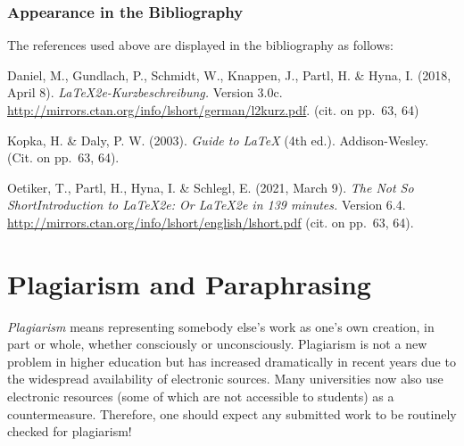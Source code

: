 \subsubsection{Appearance in the Bibliography}

\begin{sloppypar}
The references used above are displayed in the bibliography as follows:
%
\begin{list}{}{
\setlength{\leftmargin}{1.3cm}
\setlength{\itemindent}{-1.3cm}
\setlength{\itemsep}{-0.15cm}
}
\item
Daniel, M., Gundlach, P., Schmidt, W., Knappen, J., Partl, H. \& Hyna, I.
(2018, April 8). \textit{\LaTeX2e-Kurzbeschreibung.} Version 3.0c.
\textrm{\url{http://mirrors.ctan.org/info/lshort/german/l2kurz.pdf}}.
(cit. on pp.\ 63, 64)
\item
Kopka, H. \& Daly, P. W. (2003). \textit{Guide to \LaTeX} (4th ed.).
Addison-Wesley. (Cit. on pp.\ 63, 64).
\item
Oetiker, T., Partl, H., Hyna, I. \& Schlegl, E. (2021, March 9). \textit{The
Not So ShortIntroduction to \LaTeX2e: Or \LaTeX2e in 139 minutes.} Version 6.4.
\url{http://mirrors.ctan.org/info/lshort/english/lshort.pdf} (cit. on pp.\
63, 64).
\end{list}
\end{sloppypar}


\section{Plagiarism and Paraphrasing}
\label{sec:plagiarism}

\emph{Plagiarism} means representing somebody else's work as one's own creation, in part
or whole, whether consciously or unconsciously. Plagiarism is not a new problem
in higher education but has increased dramatically in recent years due
to the widespread availability of electronic sources. Many universities now also use electronic
resources (some of which are not accessible to students) as a countermeasure.
Therefore, one should expect any submitted work to be routinely checked for
plagiarism!

